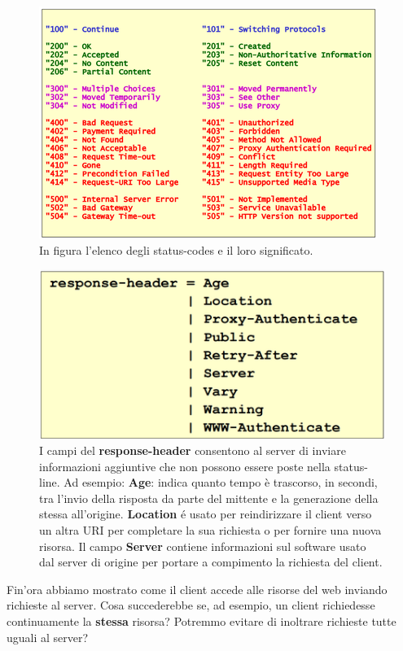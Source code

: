 \documentclass[11pt,a4paper]{article}
\theoremstyle{definition}
\begin{document}
\begin{figure}[!h]
	\includegraphics[scale=0.3]{Immagini/Stat_code.png}
	\centering
	\caption{In figura l'elenco degli status-codes e il loro significato.}
\end{figure}
\begin{figure}[!h]
	\includegraphics[scale=0.3]{Immagini/Resp_h.png}
	\centering
	\caption{I campi del \textbf{response-header} consentono al server di inviare informazioni aggiuntive che non possono essere poste nella status-line. Ad esempio: \textbf{Age}: indica quanto tempo è trascorso, in secondi, tra l'invio della risposta da parte del mittente e la generazione della stessa all'origine. \textbf{Location} é usato per reindirizzare il client verso un altra URI per completare la sua richiesta o per fornire una nuova risorsa. Il campo \textbf{Server} contiene informazioni sul software usato dal server di origine per portare a compimento la richiesta del client.}
\end{figure}
\newpage
Fin'ora abbiamo mostrato come il client accede alle risorse del web inviando richieste al server. Cosa succederebbe se, ad esempio, un client richiedesse continuamente la \textbf{stessa} risorsa? Potremmo evitare di inoltrare richieste tutte uguali al server?\newline
\end{document}
